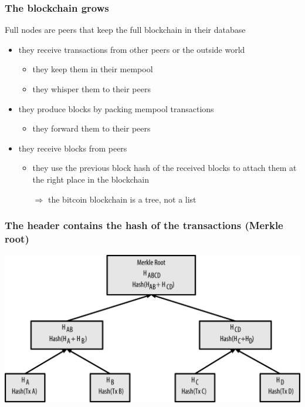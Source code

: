 \documentclass[11pt]{beamer}  %
\begin{document}
\begin{frame}\frametitle{The blockchain grows}

  \begin{greenbox}{Full nodes are peers that keep the full blockchain in their database}
    \begin{itemize}
    \item they receive transactions from other peers or the outside world
      \begin{itemize}
      \item they keep them in their mempool
      \item they whisper them to their peers
      \end{itemize}
    \item they produce blocks by packing mempool transactions
      \begin{itemize}
      \item they forward them to their peers
      \end{itemize}
    \item they receive blocks from peers
      \begin{itemize}
      \item they use the previous block hash of the received blocks to
        attach them at the right place in the blockchain

        $\Rightarrow$ the bitcoin blockchain is a tree, not a list
      \end{itemize}
    \end{itemize}
  \end{greenbox}

\end{frame}

\begin{frame}\frametitle{The header contains the hash of the transactions (Merkle root)}

  \begin{center}
    \includegraphics[width=\textwidth,clip=false]{pictures/mbc2_0902.png}
  \end{center}

\end{frame}
\end{document}
